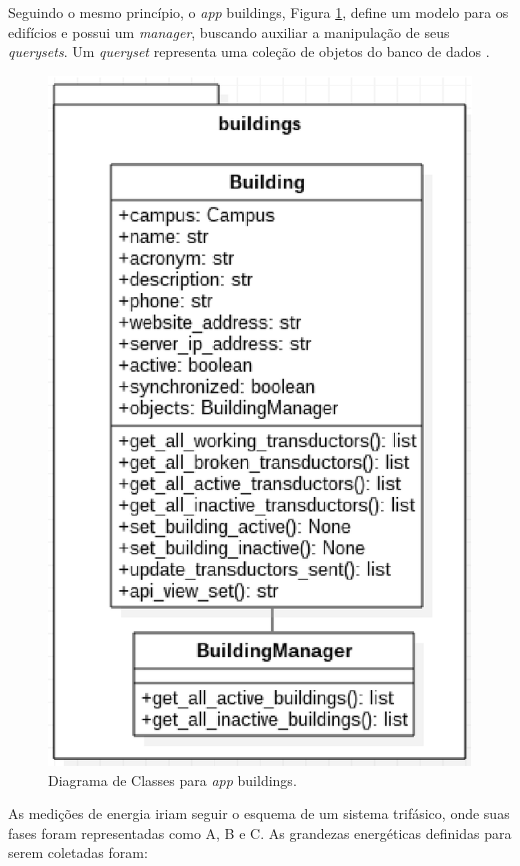 Seguindo o mesmo princípio, o \textit{app} buildings, Figura \ref{buildings}, define um modelo para os edifícios e possui um \textit{manager}, buscando auxiliar a manipulação de seus \textit{querysets}. Um \textit{queryset} representa uma coleção de objetos do banco de dados \cite{django_project}.

\begin{figure}[!h]
    \centering
    \includegraphics[keepaspectratio=true,scale=0.8]{figuras/buildings.eps}
    \caption{Diagrama de Classes para \textit{app} buildings.}
    \label{buildings}
\end{figure}

As medições de energia iriam seguir o esquema de um sistema trifásico, onde suas fases foram representadas como A, B e C. As grandezas energéticas definidas para serem coletadas foram:

